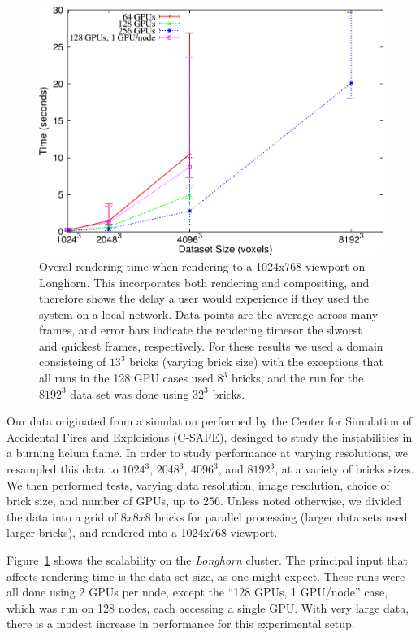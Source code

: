 \begin{figure}
  \includegraphics[width=\linewidth]{images/multiscale/rtime}

  \caption{Overal rendering time when rendering to a 1024x768 viewport
  on Longhorn.  This incorporates both rendering and compositing, and
  therefore shows the delay a user would experience if they used the
  system on a local network. Data points are the average across many
  frames, and error bars indicate the rendering timesor the slwoest and
  quickest frames, respectively.  For these results we used a domain
  consisteing of $13^3$ bricks (varying brick size) with the exceptions
  that all runs in the 128 GPU cases used $8^3$ bricks, and the run for
  the $8192^3$ data set was done using $32^3$ bricks.}
  \label{fig:rtime}
\end{figure}

Our data originated from a simulation performed by the Center for Simulation of
Accidental Fires and Exploisions (C-SAFE), desinged to study the instabilities
in a burning helum flame.  In order to study performance at varying
resolutions, we resampled this data to $1024^3$, $2048^3$, $4096^3$, and
$8192^3$, at a variety of bricks sizes.  We then performed tests, varying data
resolution, image resolution, choice of brick size, and number of GPUs, up to
256.  Unless noted otherwise, we divided the data into a grid of $8x8x8$ bricks
for parallel processing (larger data sets used larger bricks), and rendered
into a 1024x768 viewport.

Figure~\ref{fig:rtime} shows the scalability on the \textit{Longhorn}
cluster.  The principal input that affects rendering time is the data
set size, as one might expect.  These runs were all done using 2 GPUs
per node, except the ``128 GPUs, 1 GPU/node'' case, which was run on
128 nodes, each accessing a single GPU.  With very large data, there is
a modest increase in performance for this experimental setup.

